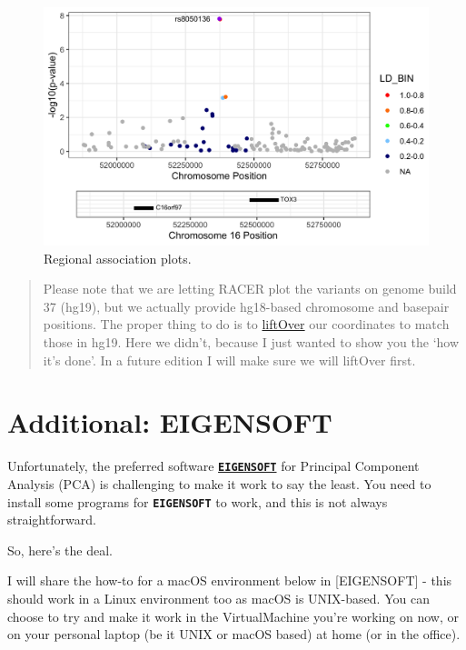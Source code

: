 \documentclass[
]{book}
\newcommand{\passthrough}[1]{#1}
\begin{document}
\begin{figure}

{\centering \includegraphics[width=25.25in]{img/_gwas/rs8050136.rs8050136.regional_assoc} 

}

\caption{Regional association plots.}\label{fig:show-racer}
\end{figure}

\begin{quote}
Please note that we are letting RACER plot the variants on genome build 37 (hg19), but we actually provide hg18-based chromosome and basepair positions. The proper thing to do is to \href{https://genome.sph.umich.edu/wiki/LiftOver}{liftOver} our coordinates to match those in hg19. Here we didn't, because I just wanted to show you the `how it's done'. In a future edition I will make sure we will liftOver first.
\end{quote}

\hypertarget{eigensoft}{%
\chapter{Additional: EIGENSOFT}\label{eigensoft}}

Unfortunately, the preferred software \textbf{\href{https://github.com/DReichLab/EIG}{\passthrough{\lstinline!EIGENSOFT!}}} for Principal Component Analysis (PCA) is challenging to make it work to say the least. You need to install some programs for \textbf{\passthrough{\lstinline!EIGENSOFT!}} to work, and this is not always straightforward.

So, here's the deal.

I will share the how-to for a macOS environment below in {[}EIGENSOFT{]} - this should work in a Linux environment too as macOS is UNIX-based. You can choose to try and make it work in the VirtualMachine you're working on now, or on your personal laptop (be it UNIX or macOS based) at home (or in the office).
\end{document}
